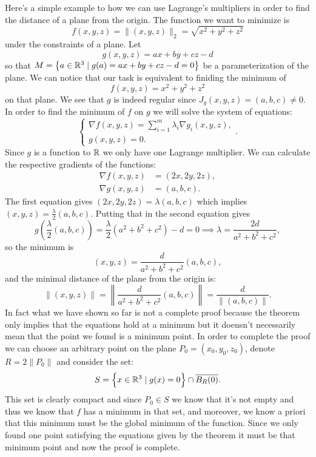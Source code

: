 \documentclass[11pt,a4paper]{article}
\begin{document}
\begin{example}
  \label{exmp:langrage}
  Here's a simple example to how we can use Lagrange's multipliers in order
  to find the distance of a plane from the origin.
  The function we want to minimize is
  \[
    f(x,y,z) = \|(x,y,z)\|_2 = \sqrt{x^2 + y^2 + z^2}
  \]
  under the constraints of a plane.
  Let
  \[
    g(x,y,z) = ax + by + cz - d
  \]
  so that $M = \left\{a \in \mathbb{R}^3 \mid g(a) = ax + by + cz - d = 0\right\}$
  be a parameterization of the plane.
  We can notice that our task is equivalent to finiding the minimum of
  \[
    f(x,y,z) = x^2 + y^2 + z^2
  \]
  on that plane.
  We see that $g$ is indeed regular since $J_g(x,y,z) = (a,b,c) \neq 0$.
  In order to find the minimum of $f$ on $g$
  we will solve the system of equations:
  \[
    \begin{cases}
      \nabla f(x,y,z) = \sum_{i = 1}^{m}{\lambda_i \nabla g_i(x,y,z)}, \\
      g(x,y,z) = 0.
    \end{cases}.
  \]
  Since $g$ is a function to $\mathbb{R}$ we only have one Lagrange multiplier.
  We can calculate the respective gradients of the functions:
  \begin{align*}
    \nabla f(x,y,z) &= (2x,2y,2z), \\
    \nabla g(x,y,z) &= (a,b,c).
  \end{align*}
  The first equation gives $(2x,2y,2z) = \lambda (a,b,c)$
  which implies $(x,y,z) = \frac{\lambda}{2} (a,b,c)$.
  Putting that in the second equation gives
  \[
    g\left(\frac{\lambda}{2} (a,b,c)\right) = 
    \frac{\lambda}{2}(a^2 + b^2 + c^2) - d = 0
    \implies
    \lambda = \frac{2d}{a^2 + b^2 + c^2},
  \]
  so the minimum is
  \[
    (x,y,z) = \frac{d}{a^2 + b^2 + c^2} (a,b,c),
  \]
  and the minimal distance of the plane from the origin is:
  \[
    \|(x,y,z)\| = \left\|\frac{d}{a^2 + b^2 + c^2} (a,b,c)\right\| = 
    \frac{d}{\|(a,b,c)\|}.
  \]
  In fact what we have shown so far is not a complete proof because
  the theorem only implies that the equations hold at a minimum
  but it doensn't necessarily mean that the point we found is a minimum
  point. In order to complete the proof we can choose an arbitrary point on the
  plane $P_0 = (x_0,y_0,z_0)$, denote $R = 2\|P_0\|$ and consider
  the set:
  \[
    S = \left\{x \in \mathbb{R}^3 \mid g(x) = 0\right\} \cap \overline{B_R(0)}.
  \]
  This set is clearly compact and since $P_0 \in S$ we know that it's not 
  empty and thus we know that $f$ has a minimum in that set, and moreover,
  we know a priori that this minimum must be the global minimum of the
  function. Since we only found one point satisfying the equations given
  by the theorem it must be that minimum point and now the proof is 
  complete.
\end{example}
\end{document}
